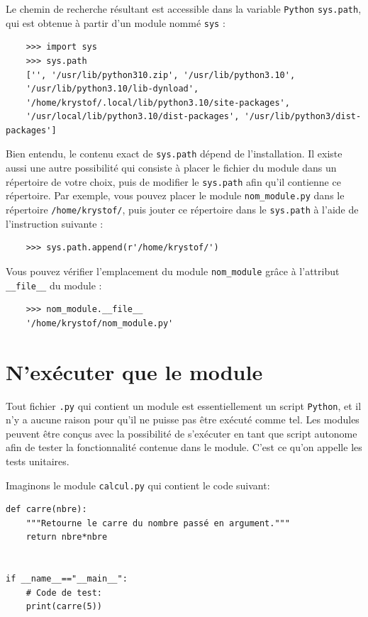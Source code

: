 \documentclass[a4paper,11pt]{book}
\begin{document}
Le chemin de recherche résultant est accessible dans la variable \texttt{Python} \texttt{sys.path}, qui est obtenue à partir d'un module nommé \texttt{sys} :
\begin{verbatim}
    >>> import sys
    >>> sys.path
    ['', '/usr/lib/python310.zip', '/usr/lib/python3.10', 
    '/usr/lib/python3.10/lib-dynload', 
    '/home/krystof/.local/lib/python3.10/site-packages', 
    '/usr/local/lib/python3.10/dist-packages', '/usr/lib/python3/dist-packages']
\end{verbatim}
\medskip

Bien entendu, le contenu exact de \texttt{sys.path} dépend de l'installation. Il existe aussi une autre possibilité qui consiste à placer le fichier du module dans un répertoire de votre choix, puis de modifier le \texttt{sys.path} afin qu'il contienne ce répertoire. Par exemple, vous pouvez placer le module \texttt{nom\_module.py} dans le répertoire \texttt{/home/krystof/}, puis jouter ce répertoire dans le \texttt{sys.path} à l'aide de l'instruction suivante :
\begin{verbatim}
    >>> sys.path.append(r'/home/krystof/')
\end{verbatim}
\medskip

Vous pouvez vérifier l'emplacement du module \texttt{nom\_module} grâce à l'attribut \texttt{\_\_file\_\_} du module :
\begin{verbatim}
    >>> nom_module.__file__
    '/home/krystof/nom_module.py'
\end{verbatim}
\medskip

\section{N'exécuter que le module}
Tout fichier \texttt{.py} qui contient un module est essentiellement un script \texttt{Python}, et il n'y a aucune raison pour qu'il ne puisse pas être exécuté comme tel. Les modules peuvent être conçus avec la possibilité de s'exécuter en tant que script autonome afin de tester la fonctionnalité contenue dans le module. C'est ce qu'on appelle les tests unitaires.
\medskip

Imaginons le module \texttt{calcul.py} qui contient le code suivant:
\begin{lstlisting}[caption=Module \texttt{calcul.py}]
def carre(nbre):
	"""Retourne le carre du nombre passé en argument."""
	return nbre*nbre


if __name__=="__main__":
	# Code de test:
    print(carre(5))
\end{lstlisting}
\medskip
\end{document}
